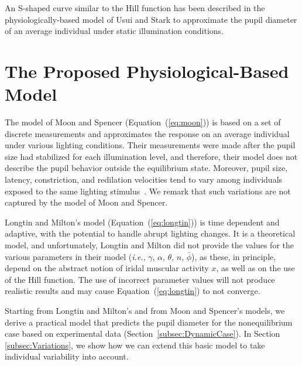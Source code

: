 \documentclass{acmtog}
\begin{document}
An S-shaped curve similar to the Hill function has been described in the physiologically-based model of Usui and Stark to approximate the pupil diameter of an average individual under static illumination conditions.

\section{The Proposed Physiological-Based Model}
\label{sec:proposed_model}
%
The  model of Moon and Spencer (Equation~(\ref{eq:moon})) is based on a set of discrete measurements and approximates the
response on an average individual under various lighting conditions. Their measurements were made after the pupil size
had stabilized for each  illumination level, and therefore, their model does not describe the pupil behavior outside the
equilibrium state. Moreover, pupil size, latency, constriction, and redilation velocities tend to vary among individuals
exposed to the same lighting stimulus~\cite{GPMBH-2005}. We remark that such variations are not captured by the
model of Moon and Spencer. 
    
Longtin and Milton's model (Equation~(\ref{eq:longtin})) is time dependent and adaptive, with the potential to handle
abrupt lighting changes. It is a theoretical model, and unfortunately, Longtin and Milton did not provide the values for
the various parameters in their model (\emph{i.e.}, $\gamma$, $\alpha$, $\theta$, $n$, $\bar{\phi}$), as these, in
principle, depend on the abstract notion of iridal muscular activity $x$, as well as on the use of the Hill function. The
use of incorrect parameter values will not produce realistic results and may cause Equation~(\ref{eq:longtin})  to not
converge.

Starting from  Longtin and Milton's and from Moon and Spencer's models, we derive a practical 
model that predicts the pupil diameter for the nonequilibrium case based on experimental data (Section~\ref{subsec:DynamicCase}). In Section \ref{subsec:Variations}, we show how we can extend this basic model to take individual variability into account.
\end{document}
